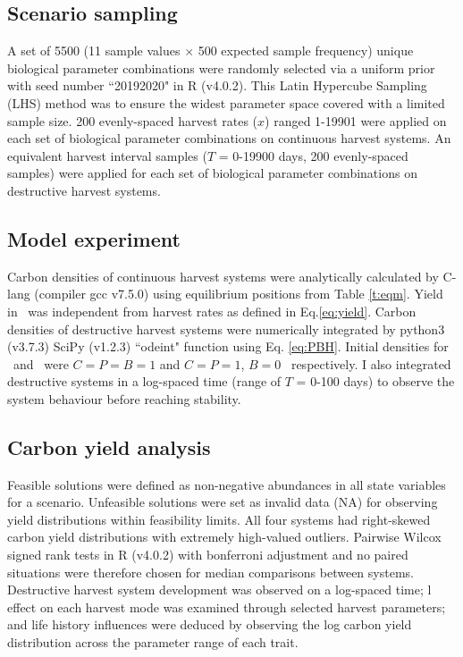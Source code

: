 \documentclass[../thesis.tex]{subfiles} %
\begin{document}
\subsection{Scenario sampling}
A set of 5500 (11 sample values $\times$ 500 expected sample frequency) unique biological parameter combinations were randomly selected via a uniform prior with seed number ``20192020" in R (v4.0.2).  This Latin Hypercube Sampling (LHS) method was to ensure the widest parameter space covered with a limited sample size.  200 evenly-spaced harvest rates ($x$) ranged 1-19901 \dayU were applied on each set of biological parameter combinations on continuous harvest systems.  An equivalent harvest interval samples ($T$ = 0-19900 days, 200 evenly-spaced samples) were applied for each set of biological parameter combinations on destructive harvest systems.

\subsection{Model experiment}
Carbon densities of continuous harvest systems were analytically calculated by C-lang (compiler gcc v7.5.0) using equilibrium positions from Table \ref{t:eqm}. Yield in \PoH\ was independent from harvest rates as defined in Eq.\ref{eq:yield}.  Carbon densities of destructive harvest systems were numerically integrated by python3 (v3.7.3) SciPy (v1.2.3) ``odeint" function using Eq. \ref{eq:PBH}.  Initial densities for \PBN\ and \PoN\ were $C=P=B=1$ and $C=P=1$, $B=0$ \den\ respectively.  I also integrated destructive systems in a log-spaced time (range of $T$ = 0-100 days) to observe the system behaviour before reaching stability.

\subsection{Carbon yield analysis}
Feasible solutions were defined as non-negative abundances in all state variables for a scenario.  Unfeasible solutions were set as invalid data (NA) for observing yield distributions within feasibility limits.  All four systems had right-skewed carbon yield distributions with extremely high-valued outliers.  Pairwise Wilcox signed rank tests in R (v4.0.2) with bonferroni adjustment and no paired situations were therefore chosen for median comparisons between systems.  Destructive harvest system development was observed on a log-spaced time; \bac l effect on each harvest mode was examined through selected harvest parameters; and life history influences were deduced by observing the log carbon yield distribution across the parameter range of each trait.
\end{document}
